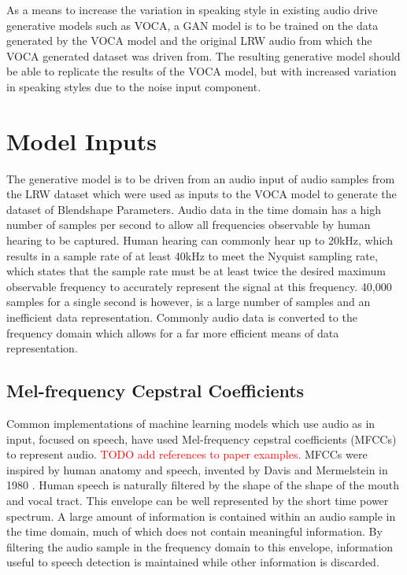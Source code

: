 As a means to increase the variation in speaking style in existing audio drive generative models such as VOCA, a GAN model is to be trained on the data generated by the VOCA model and the original LRW audio from which the VOCA generated dataset was driven from.
The resulting generative model should be able to replicate the results of the VOCA model, but with increased variation in speaking styles due to the noise input component.

\section{Model Inputs}
The generative model is to be driven from an audio input of audio samples from the LRW dataset which were used as inputs to the VOCA model to generate the dataset of Blendshape Parameters.
Audio data in the time domain has a high number of samples per second to allow all frequencies observable by human hearing to be captured.
Human hearing can commonly hear up to 20kHz, which results in a sample rate of at least 40kHz to meet the Nyquist sampling rate, which states that the sample rate must be at least twice the desired maximum observable frequency to accurately represent the signal at this frequency.
40,000 samples for a single second is however, is a large number of samples and an inefficient data representation.
Commonly audio data is converted to the frequency domain which allows for a far more efficient means of data representation. 

\subsection{Mel-frequency Cepstral Coefficients}
Common implementations of machine learning models which use audio as in input, focused on speech, have used Mel-frequency cepstral coefficients (MFCCs) to represent audio.
\textcolor{red}{TODO add references to paper examples.}
MFCCs were inspired by human anatomy and speech, invented by Davis and Mermelstein in 1980 \cite{Davis1980}.
Human speech is naturally filtered by the shape of the shape of the mouth and vocal tract.
This envelope can be well represented by the short time power spectrum.
A large amount of information is contained within an audio sample in the time domain, much of which does not contain meaningful information.
By filtering the audio sample in the frequency domain to this envelope, information useful to speech detection is maintained while other information is discarded.


